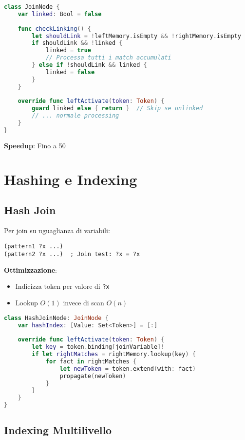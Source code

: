\begin{lstlisting}[language=Swift]
class JoinNode {
    var linked: Bool = false
    
    func checkLinking() {
        let shouldLink = !leftMemory.isEmpty && !rightMemory.isEmpty
        if shouldLink && !linked {
            linked = true
            // Processa tutti i match accumulati
        } else if !shouldLink && linked {
            linked = false
        }
    }
    
    override func leftActivate(token: Token) {
        guard linked else { return }  // Skip se unlinked
        // ... normale processing
    }
}
\end{lstlisting}

\textbf{Speedup}: Fino a 50%

\section{Hashing e Indexing}

\subsection{Hash Join}

Per join su uguaglianza di variabili:

\begin{lstlisting}[language=CLIPS]
(pattern1 ?x ...)
(pattern2 ?x ...)  ; Join test: ?x = ?x
\end{lstlisting}

\textbf{Ottimizzazione}:
\begin{itemize}
\item Indicizza token per valore di \texttt{?x}
\item Lookup $O(1)$ invece di scan $O(n)$
\end{itemize}

\begin{lstlisting}[language=Swift]
class HashJoinNode: JoinNode {
    var hashIndex: [Value: Set<Token>] = [:]
    
    override func leftActivate(token: Token) {
        let key = token.binding[joinVariable]!
        if let rightMatches = rightMemory.lookup(key) {
            for fact in rightMatches {
                let newToken = token.extend(with: fact)
                propagate(newToken)
            }
        }
    }
}
\end{lstlisting}

\subsection{Indexing Multilivello}

